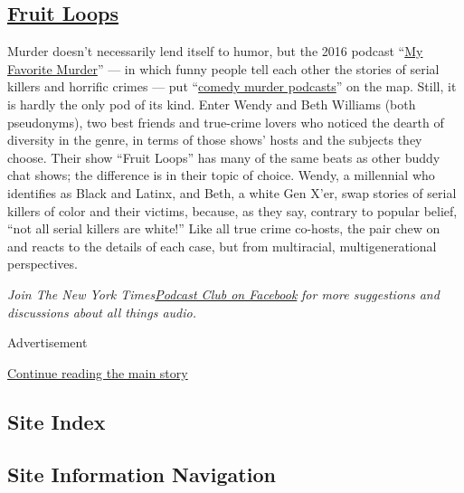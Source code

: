 \hypertarget{fruit-loops}{%
\subsection{\texorpdfstring{\href{https://fruitloopspod.com/\#:~:text=Fruitloops\%20is\%20a\%20weekly\%20podcast,by\%20serial\%20killers\%20of\%20color.}{Fruit
Loops}}{Fruit Loops}}\label{fruit-loops}}

Murder doesn't necessarily lend itself to humor, but the 2016 podcast
``\href{https://www.nytimes3xbfgragh.onion/2018/05/19/style/my-favorite-murder-podcast-murderinos.html}{My
Favorite Murder}'' --- in which funny people tell each other the stories
of serial killers and horrific crimes --- put
``\href{https://www.nytimes3xbfgragh.onion/2018/02/16/arts/television/the-transgressive-appeal-of-the-comedy-murder-podcast.html}{comedy
murder podcasts}'' on the map. Still, it is hardly the only pod of its
kind. Enter Wendy and Beth Williams (both pseudonyms), two best friends
and true-crime lovers who noticed the dearth of diversity in the genre,
in terms of those shows' hosts and the subjects they choose. Their show
``Fruit Loops'' has many of the same beats as other buddy chat shows;
the difference is in their topic of choice. Wendy, a millennial who
identifies as Black and Latinx, and Beth, a white Gen X'er, swap stories
of serial killers of color and their victims, because, as they say,
contrary to popular belief, ``not all serial killers are white!'' Like
all true crime co-hosts, the pair chew on and reacts to the details of
each case, but from multiracial, multigenerational perspectives.

\emph{Join The New York
Times}\href{https://www.facebookcorewwwi.onion/groups/nytpodcastclub/}{\emph{Podcast
Club on Facebook}} \emph{for more suggestions and discussions about all
things audio.}

Advertisement

\protect\hyperlink{after-bottom}{Continue reading the main story}

\hypertarget{site-index}{%
\subsection{Site Index}\label{site-index}}

\hypertarget{site-information-navigation}{%
\subsection{Site Information
Navigation}\label{site-information-navigation}}

